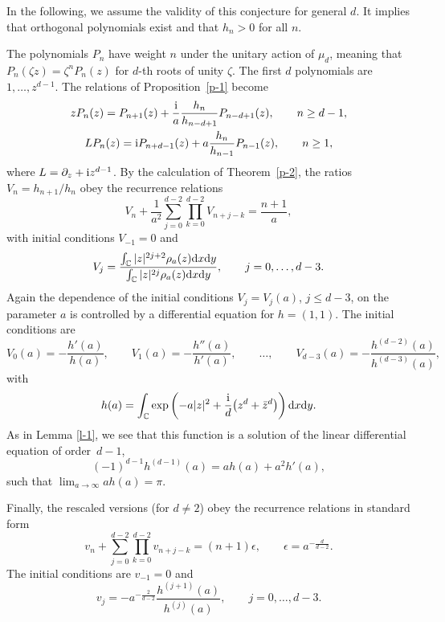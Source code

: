 \documentclass[10pt,a4paper]{amsart}
\numberwithin{equation}{section}
\theoremstyle{definition}
\begin{document}
In the following, we assume the validity of this conjecture for general $d$. It implies that orthogonal polynomials exist and that $h_n>0$ for all $n$.

The polynomials $P_n$ have weight $n$ under the unitary action of $\mu_d$, meaning that $P_n(\zeta z)=\zeta^nP_n(z)$ for $d$-th roots of unity $\zeta$. The first $d$ polynomials are $1,\dots,z^{d-1}$.
The relations of Proposition~\ref{p-1} become
\begin{gather}\label{e-rec1}
 zP_n(z) = P_{n+1}(z)+\frac{\rm i}{a}\frac{h_n}{h_{n-d+1}}P_{n-d+1}(z),\qquad n\geq d-1,
 \\
 LP_n(z) = {\rm i} P_{n+d-1}(z)+a\frac{h_n}{h_{n-1}}P_{n-1}(z),\qquad n\geq1, \label{e-rec2}
\end{gather}
where $L=\partial_z+{\rm i}z^{d-1}$.
By the calculation of Theorem~\ref{p-2}, the ratios $V_n=h_{n+1}/h_n$ obey the recurrence relations
\begin{equation}\label{e-3}
V_n+\frac{1}{a^2}\sum_{j=0}^{d-2}\prod_{k=0}^{d-2}V_{n+j-k}=\frac{n+1}a,
\end{equation}
with initial conditions $V_{-1}=0$ and
\[
V_j=\frac{\int_{\mathbb C}|z|^{2j+2}\rho_{a}(z){\rm d}x{\rm d}y}{\int_{\mathbb C}|z|^{2j}\rho_{a}(z){\rm d}x{\rm d}y},\qquad j=0,\dots, d-3.
\]
Again the dependence of the initial conditions $V_j=V_j(a)$, $j\leq d-3$, on the parameter $a$ is controlled by a differential equation for $h=(1,1)$. The initial conditions are
\[
V_0(a)=-\frac{h'(a)}{h(a)},\qquad V_1(a)=-\frac{h''(a)}{h'(a)},\qquad \dots,\qquad
V_{d-3}(a)=-\frac{h^{(d-2)}(a)}{h^{(d-3)}(a)},
\]
with
\begin{equation}\label{e-h}
h(a)=\int_{\mathbb C}\exp\left(-a|z|^2+\frac {\rm i}d\bigl(z^d+\bar z^d\bigr)\right){\rm d}x{\rm d}y.
\end{equation}
As in Lemma \ref{l-1}, we see that this function is a solution of the linear differential equation of order~${d-1}$,
\begin{equation}\label{e-4}
(-1)^{d-1}h^{(d-1)}(a)=ah(a)+a^2h'(a),
\end{equation}
such that $\lim_{a\to \infty}ah(a)=\pi$.

Finally, the rescaled versions (for $d\neq2$)
obey the recurrence relations in standard form \cite{AHK2019,CornalbaTaylor1999, Hoppe2025}
\[
v_n+\sum_{j=0}^{d-2}\prod_{k=0}^{d-2}v_{n+j-k}=(n+1)\epsilon, \qquad \epsilon=a^{{-\frac d{d-2}}}.
\]
The initial conditions are $v_{-1}=0$ and
\[
v_j=-a^{{-\frac{2}{d-2}}}\frac{h^{(j+1)}(a)}{h^{(j)}(a)},\qquad j=0,\dots,d-3.
\]
\end{document}
